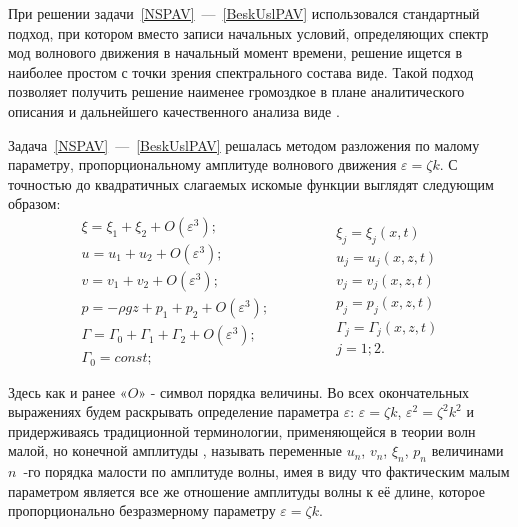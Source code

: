 При решении задачи~\eqref{NSPAV}~---~\eqref{BeskUslPAV} использовался стандартный подход, при котором вместо записи начальных условий, определяющих спектр мод волнового движения в начальный момент времени, решение ищется в наиболее простом с точки зрения спектрального состава виде. Такой подход позволяет получить решение наименее громоздкое в плане аналитического описания и дальнейшего качественного анализа виде \parencite{???}.

Задача~\eqref{NSPAV}~---~\eqref{BeskUslPAV} решалась методом разложения по малому параметру, пропорциональному амплитуде волнового движения $ \varepsilon = \zeta k $. С точностью до квадратичных слагаемых искомые функции выглядят следующим образом:
\begin{equation}
\begin{matrix}
\xi=\xi_{1}+\xi_{2}+O\left( \varepsilon^{3}\right);\\
u=u_{1}+u_{2}+O\left( \varepsilon^{3}\right);\\
v=v_{1}+v_{2}+O\left( \varepsilon^{3}\right);\\
p=-\rho g z +p_{1}+p_{2}+O\left( \varepsilon^{3}\right);\\
\Gamma=\Gamma_{0}+\Gamma_{1}+\Gamma_{2}+O\left( \varepsilon^{3}\right);\\
\Gamma_{0}=const;
\end{matrix}\qquad \qquad \begin{matrix}
\xi_{j}=\xi_{j}\left( x, t \right)\\
u_{j}=u_{j}\left( x, z, t \right)\\
v_{j}=v_{j}\left( x, z, t \right)\\
p_{j}=p_{j}\left( x, z, t \right)\\
\Gamma_{j}=\Gamma_{j}\left( x, z, t \right)\\
j=1; 2.
\end{matrix}
\label{RazlozhPAV}
\end{equation}

Здесь как и ранее «$ O $» - символ порядка величины. Во всех окончательных выражениях будем раскрывать определение параметра $ \varepsilon $: $ \varepsilon = \zeta k $, $ \varepsilon^{2} = \zeta^{2} k^{2} $ и придерживаясь традиционной терминологии, применяющейся в теории волн малой, но конечной амплитуды \parencite{Nayfeh, Nayfeh1971}, называть переменные $ u_{n} $, $ v_{n} $, $ \xi_{n} $, $ p_{n} $ величинами $ n $~-го порядка малости по амплитуде волны, имея в виду что фактическим малым параметром является все же отношение амплитуды волны к её длине, которое пропорционально безразмерному параметру $ \varepsilon = \zeta k $.

